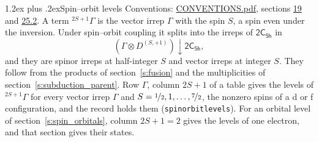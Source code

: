 \documentclass[10pt,a4paper]{article}
\makeatletter
\renewcommand\section{\@startsection{section}{1}{\z@}{-3ex plus -1ex minus -.2ex}%
  {1.2ex plus .2ex}{\normalfont\large\sffamily\bfseries\color{parttitle}}}
\numberwithin{equation}{section}
\newcommand{\grp}[1]{\mathsf{#1}}
\newcommand{\restr}[2]{#1\!\downarrow#2}
\newcommand{\irrJp}[2]{D^{(#1,#2)}}
\newcommand{\irrprod}{\otimes}
\newcommand{\term}[2]{{}^{#1}#2}
\makeatother
\begin{document}
\section{Spin--orbit levels}\label{s:spin_orbit}
Conventions: \href{../../CONVENTIONS.pdf}{CONVENTIONS.pdf}, sections \href{../../../rotation/CONVENTIONS.pdf\#conv.19}{19} and \href{../../CONVENTIONS.pdf\#conv.25.2}{25.2}.
\leavevmode\label{n:local.spin}\label{n:symbol.term}A term $\term{2S+1}{\Gamma}$ is the vector irrep $\Gamma$ with the spin $S$, a spin even under the inversion. Under spin--orbit coupling it splits into the irreps of $\grp{2C_{5h}}$ in
\begin{equation}\label{e:spinorbit}\restr{(\Gamma \irrprod \irrJp{S}{+1})}{\grp{2C_{5h}}},\end{equation}
and they are spinor irreps at half-integer $S$ and vector irreps at integer $S$. They follow from the products of section~\ref{s:fusion} and the multiplicities of section~\ref{s:subduction_parent}. Row $\Gamma$, column $2S + 1$ of a table gives the levels of $\term{2S+1}{\Gamma}$ for every vector irrep $\Gamma$ and $S = \nicefrac{1}{2}, 1, \dots, \nicefrac{7}{2}$, the nonzero spins of a d or f configuration, and the record holds them (\texttt{spinorbitlevels}). For an orbital level of section~\ref{s:spin_orbitals}, column $2S + 1 = 2$ gives the levels of one electron, and that section gives their states.
\end{document}
